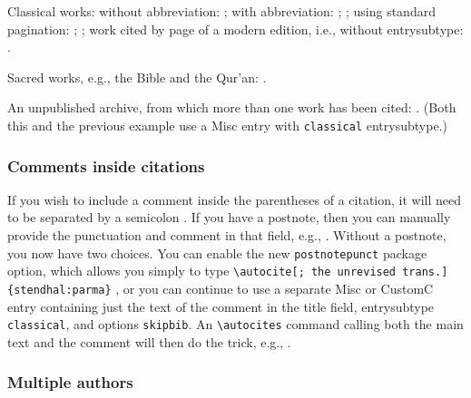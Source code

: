\documentclass[a4paper,12pt]{report}
\newcommand{\cmd}[1]{\texttt{\textbackslash #1}}
\begin{document}

Classical works: without abbreviation:
\autocite{aristotle:metaphy:trans}; with abbreviation:
\autocite{aristotle:metaphy:gr}; \autocite{plato:republic:gr}; using
standard pagination: \autocite*[3.2.996b5--8]{aristotle:metaphy:gr};
\autocite*[420e]{plato:republic:gr}; work cited by page of a modern
edition, i.e., without \textsf{entrysubtype}:
\autocite[198]{euripides:orestes}.

Sacred works, e.g., the Bible and the Qur'an:
\autocite[25:19--36:43]{genesis}.

An unpublished archive, from which more than one work has been cited:
\autocite[file 12]{house:papers}.  (Both this and the previous example
use a Misc entry with \texttt{classical} \textsf{entrysubtype}.)

\subsubsection*{Comments inside citations}
\label{sec:comments}

If you wish to include a comment inside the parentheses of a citation,
it will need to be separated by a semicolon
\autocite[15.23]{chicago:manual}.  If you have a \textsf{postnote},
then you can manually provide the punctuation and comment in that
field, e.g., \autocite[4; the unrevised trans.]{stendhal:parma}.
Without a \textsf{postnote}, you now have two choices.  You can enable
the new \texttt{postnotepunct} package option, which allows you simply
to type \cmd{autocite[; the unrevised trans.]\{stendhal:parma\}}
\citereset\autocite[; the unrevised trans.]{stendhal:parma}, or you
can continue to use a separate \textsf{Misc} or \textsf{CustomC} entry
containing just the text of the comment in the \textsf{title} field,
\textsf{entrysubtype} \texttt{classical}, and \textsf{options}
\texttt{skipbib}.  An \cmd{autocites} command calling both the main
text and the comment will then do the trick, e.g.,
\autocites{chicago:manual}{chicago:comment}.

\subsubsection*{Multiple authors}
\label{sec:multiple}
\end{document}
